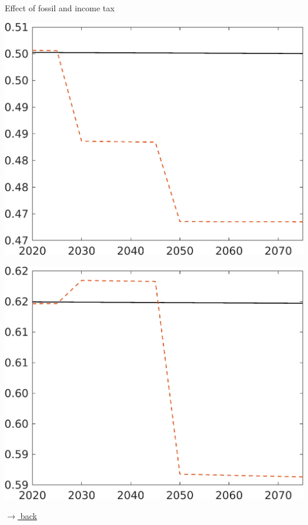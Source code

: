 \documentclass[11pt,aspectratio=169]{beamer}
\begin{document}
\begin{frame}{Effect of fossil and income tax}
\begin{minipage}[]{0.3\textwidth}
	\end{minipage}
	\begin{minipage}[]{0.3\textwidth}
		\includegraphics[width=1\textwidth]{../codding_model/own_basedOnFried/optimalPol_elastS_DisuSci/figures/all_1705/CompCounterFac_withLF_noopt_taufopt1_taulopt0_EY_spillover0_noskill0_sep1_BN0_ineq0_red0_xgrowth0_etaa0.79_lgd0.png}
	\end{minipage}
	\begin{minipage}[]{0.3\textwidth}
		\includegraphics[width=1\textwidth]{../codding_model/own_basedOnFried/optimalPol_elastS_DisuSci/figures/all_1705/CompCounterFac_withLF_noopt_taufopt1_taulopt0_CY_spillover0_noskill0_sep1_BN0_ineq0_red0_xgrowth0_etaa0.79_lgd0.png}
	\end{minipage}
	
	\vspace{-1mm}
	\hfill
	\hyperlink{effalloback}{\tiny{$\rightarrow$ back}} 
\end{frame}
\end{document}
